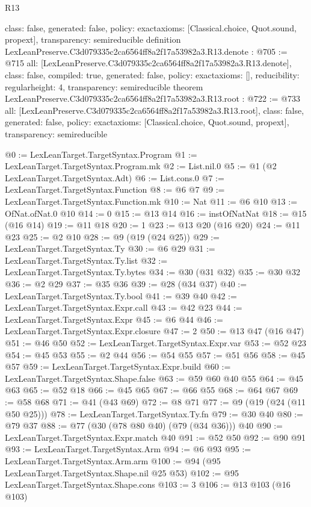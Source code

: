 \begin{lexlean}{R13}
\begin{coremodule}
{  class: false,
  generated: false,
  policy: exact{axioms: [Classical.choice, Quot.sound, propext]},
  transparency: semireducible
}
definition LexLeanPreserve.C3d079335c2ca6564ff8a2f17a53982a3.R13.denote : @705 := @715 {
  all: [LexLeanPreserve.C3d079335c2ca6564ff8a2f17a53982a3.R13.denote],
  class: false,
  compiled: true,
  generated: false,
  policy: exact{axioms: []},
  reducibility: regular{height: 4},
  transparency: semireducible
}
theorem LexLeanPreserve.C3d079335c2ca6564ff8a2f17a53982a3.R13.root : @722 := @733 {
  all: [LexLeanPreserve.C3d079335c2ca6564ff8a2f17a53982a3.R13.root],
  class: false,
  generated: false,
  policy: exact{axioms: [Classical.choice, Quot.sound, propext]},
  transparency: semireducible
}

@0 := LexLeanTarget.TargetSyntax.Program
@1 := LexLeanTarget.TargetSyntax.Program.mk
@2 := List.nil.{0}
@5 := @1 (@2 LexLeanTarget.TargetSyntax.Adt)
@6 := List.cons.{0}
@7 := LexLeanTarget.TargetSyntax.Function
@8 := @6 @7
@9 := LexLeanTarget.TargetSyntax.Function.mk
@10 := Nat
@11 := @6 @10
@13 := OfNat.ofNat.{0} @10
@14 := 0
@15 := @13 @14
@16 := instOfNatNat
@18 := @15 (@16 @14)
@19 := @11 @18
@20 := 1
@23 := @13 @20 (@16 @20)
@24 := @11 @23
@25 := @2 @10
@28 := @9 (@19 (@24 @25))
@29 := LexLeanTarget.TargetSyntax.Ty
@30 := @6 @29
@31 := LexLeanTarget.TargetSyntax.Ty.list
@32 := LexLeanTarget.TargetSyntax.Ty.bytes
@34 := @30 (@31 @32)
@35 := @30 @32
@36 := @2 @29
@37 := @35 @36
@39 := @28 (@34 @37)
@40 := LexLeanTarget.TargetSyntax.Ty.bool
@41 := @39 @40
@42 := LexLeanTarget.TargetSyntax.Expr.call
@43 := @42 @23
@44 := LexLeanTarget.TargetSyntax.Expr
@45 := @6 @44
@46 := LexLeanTarget.TargetSyntax.Expr.closure
@47 := 2
@50 := @13 @47 (@16 @47)
@51 := @46 @50
@52 := LexLeanTarget.TargetSyntax.Expr.var
@53 := @52 @23
@54 := @45 @53
@55 := @2 @44
@56 := @54 @55
@57 := @51 @56
@58 := @45 @57
@59 := LexLeanTarget.TargetSyntax.Expr.build
@60 := LexLeanTarget.TargetSyntax.Shape.false
@63 := @59 @60 @40 @55
@64 := @45 @63
@65 := @52 @18
@66 := @45 @65
@67 := @66 @55
@68 := @64 @67
@69 := @58 @68
@71 := @41 (@43 @69)
@72 := @8 @71
@77 := @9 (@19 (@24 (@11 @50 @25)))
@78 := LexLeanTarget.TargetSyntax.Ty.fn
@79 := @30 @40
@80 := @79 @37
@88 := @77 (@30 (@78 @80 @40) (@79 (@34 @36))) @40
@90 := LexLeanTarget.TargetSyntax.Expr.match @40
@91 := @52 @50
@92 := @90 @91
@93 := LexLeanTarget.TargetSyntax.Arm
@94 := @6 @93
@95 := LexLeanTarget.TargetSyntax.Arm.arm
@100 := @94 (@95 LexLeanTarget.TargetSyntax.Shape.nil @25 @53)
@102 := @95 LexLeanTarget.TargetSyntax.Shape.cons
@103 := 3
@106 := @13 @103 (@16 @103)

\end{coremodule}
\end{lexlean}
